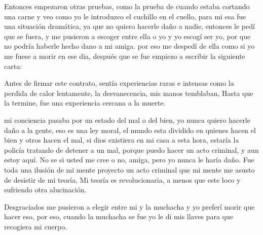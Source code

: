 \documentclass[12pt,letterpaper, a4paper ]{article}
\begin{document}
Entonces empezaron otras pruebas, como la prueba de cuando estaba cortando una carne y veo como yo le introduzco  el cuchillo en el cuello, para mi esa fue una situación dramática, ya que no quiero hacerle daño a nadie, entonces le pedí que se fuera, y me pusieron a escoger entre ella o yo y yo escogí ser yo, por que no podría haberle hecho dano a mi amiga. por eso me despedí de ella como si yo me fuese a morir en ese dia, después que se fue empiezo a escribir la siguiente carta:



Antes de firmar este contrato, sentía experiencias raras e intensas como la perdida de calor lentamente, la desvanecencia, mis manos temblaban, Hasta que la termine, fue una experiencia cercana a la muerte.

mi conciencia pasaba por un estado del mal o del bien, yo nunca quiero hacerle daño a la gente, eso es una ley moral, el mundo esta dividido en quienes hacen el bien y otros hacen el mal, si dios existiera en mi casa a esta hora, estaría la policía tratando de detener a un mal, porque puedo hacer un acto criminal, y aun estoy aquí. No se si usted me cree o no, amiga, pero yo nunca le haría daño. Fue toda una ilusión de mi mente  proyecto un acto criminal que mi mente me asusto de desistir de mi teoría, Mi teoría es revolucionaria, a menos que este loco y sufriendo otra alucinación. 

Desgraciados me pusieron a elegir entre  mi y la muchacha y yo preferí morir que hacer eso, por eso, cuando la muchacha se fue yo le di mis llaves para que recogiera mi cuerpo.
\end{document}
